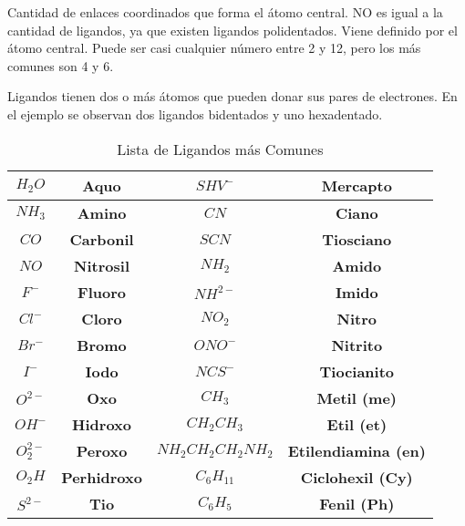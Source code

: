 \begin{definition}
	Cantidad de enlaces coordinados que forma el átomo
	central. NO es igual a la cantidad de ligandos, ya que existen ligandos polidentados.
	Viene definido por el átomo central. Puede ser casi cualquier número entre 2 y 12,
	pero los más comunes son 4 y 6.
\end{definition}


\begin{definition}
	Ligandos tienen dos o más átomos que pueden donar sus
	pares de electrones. En el ejemplo se observan dos ligandos bidentados y uno
	hexadentado.
\end{definition}

\begin{table}[h!]
	\centering
	\begin{tabular}{|c|c|c|c|}
		\hline
		$H_2O$     & \textbf{Aquo}       & $SHV^-$            & \textbf{Mercapto}           \\ \hline
		$NH_3$     & \textbf{Amino}      & $CN$               & \textbf{Ciano}              \\ \hline
		$CO$       & \textbf{Carbonil}   & $SCN$              & \textbf{Tiosciano}          \\ \hline
		$NO$       & \textbf{Nitrosil}   & $NH_2$             & \textbf{Amido}              \\ \hline
		$F^-$      & \textbf{Fluoro}     & $NH^{2-}$          & \textbf{Imido}              \\ \hline
		$Cl^-$     & \textbf{Cloro}      & $NO_2$             & \textbf{Nitro}              \\ \hline
		$Br^-$     & \textbf{Bromo}      & $ONO^-$            & \textbf{Nitrito}            \\ \hline
		$I^-$      & \textbf{Iodo}       & $NCS^-$            & \textbf{Tiocianito}         \\ \hline
		$O^{2-}$   & \textbf{Oxo}        & $CH_3$             & \textbf{Metil (me)}         \\ \hline
		$OH^-$     & \textbf{Hidroxo}    & $CH_2CH_3$         & \textbf{Etil (et)}          \\ \hline
		$O_2^{2-}$ & \textbf{Peroxo}     & $NH_2CH_2CH_2NH_2$ & \textbf{Etilendiamina (en)} \\ \hline
		$O_2H$     & \textbf{Perhidroxo} & $C_6H_11$          & \textbf{Ciclohexil (Cy)}    \\ \hline
		$S^{2-}$   & \textbf{Tio}        & $C_6H_5$           & \textbf{Fenil (Ph)}         \\ \hline
	\end{tabular}
	\caption{Lista de Ligandos más Comunes}
	\label{tabq5}
\end{table}


